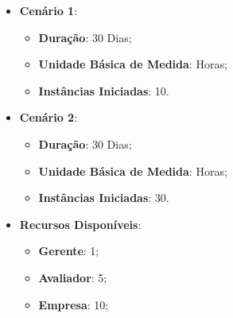 \begin{itemize}
	\item{\textbf{Cenário 1}:
		\begin{itemize}
			\item{\textbf{Duração}: 30 Dias;}
			\item{\textbf{Unidade Básica de Medida}: Horas;}
			\item{\textbf{Instâncias Iniciadas}: 10.}
		\end{itemize}}
	\item{\textbf{Cenário 2}:
		\begin{itemize}
			\item{\textbf{Duração}: 30 Dias;}
			\item{\textbf{Unidade Básica de Medida}: Horas;}
			\item{\textbf{Instâncias Iniciadas}: 30.}
		\end{itemize}}
	\item{\textbf{Recursos Disponíveis}:
		\begin{itemize}
			\item{\textbf{Gerente}: 1;}
			\item{\textbf{Avaliador}: 5;}
			\item{\textbf{Empresa}: 10;}
		\end{itemize}}
\end{itemize}